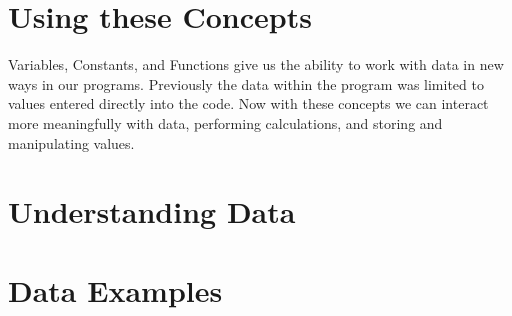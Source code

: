 

\clearpage
\section{Using these Concepts} %
\label{sec:using_these_concepts_storing_using_data}

Variables, Constants, and Functions give us the ability to work with data in new ways in our programs. Previously the data within the program was limited to values entered directly into the code. Now with these concepts we can interact more meaningfully with data, performing calculations, and storing and manipulating values.













\clearpage
\def\pageLang{none}
\section{Understanding Data} %
\label{sec:understanding_dat}





\clearpage
\section{Data Examples} %
\label{sec:data_examples}



